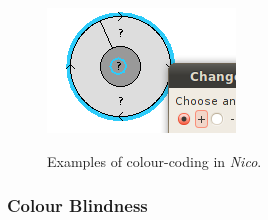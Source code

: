 \documentclass[12pt,twoside,notitlepage,xetex]{report}
\begin{document}
{\begin{center}
\begin{figure}[H]
\begin{center}
{\includegraphics[width=\textwidth/3]{figs/nico_op_hi.png}
}\hspace{2cm}
\end{center}
\caption{Examples of colour-coding in \emph{Nico}.}
\label{fig:ColourCoding}
\end{figure}
\end{center}

\subsubsection{Colour Blindness}

}
\end{document}
